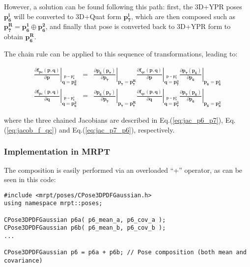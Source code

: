 \documentclass[a4paper,11pt]{report}
\begin{document}
However, a solution can be found following this path: first,
the 3D+YPR poses $\mathbf{p_6^i}$ will be converted to
3D+Quat form $\mathbf{p_7^i}$, which are then
composed such as $\mathbf{p_7^R} = \mathbf{p_6^1} \oplus \mathbf{p_6^2}$,
and finally that pose is converted back to 3D+YPR form to obtain
$\mathbf{p_6^R}$.

The chain rule can be applied to this sequence of transformations, leading to:

\begin{eqnarray}
 \left.
\frac{\partial \mathbf{f_{pc}}(\mathbf{p},\mathbf{q}) }{\partial \mathbf{p}} \right|
 _{\overset{ \mathbf{p}=\mathbf{p_6^1} }{ \mathbf{q}=\mathbf{p_6^2} }}
&=&
 \left.
\frac{\partial \mathbf{p_6} (\mathbf{p_7} ) }{\partial \mathbf{p_7}}
\right|
 _{ \mathbf{p_7}=\mathbf{p_7^R} }
 \left.
\frac{\partial \mathbf{f_{qc}} (\mathbf{p},\mathbf{q} ) }{\partial \mathbf{p}}
\right|
 _{\overset{ \mathbf{p}=\mathbf{p_7^1} }{ \mathbf{q}=\mathbf{p_7^2} }}
 \left.
\frac{\partial \mathbf{p_7} (\mathbf{p_6} ) }{\partial \mathbf{p_6}}
\right|
 _{ \mathbf{p_6}=\mathbf{p_6^1} }
\\
 \left.
\frac{\partial \mathbf{f_{pc}}(\mathbf{p},\mathbf{q}) }{\partial \mathbf{q}} \right|
 _{\overset{ \mathbf{p}=\mathbf{p_6^1} }{ \mathbf{q}=\mathbf{p_6^2} }}
&=&
 \left.
\frac{\partial \mathbf{p_6} (\mathbf{p_7} ) }{\partial \mathbf{p_7}}
\right|
 _{ \mathbf{p_7}=\mathbf{p_7^R} }
 \left.
\frac{\partial \mathbf{f_{qc}} (\mathbf{p},\mathbf{q} ) }{\partial \mathbf{q}}
\right|
 _{\overset{ \mathbf{p}=\mathbf{p_7^1} }{ \mathbf{q}=\mathbf{p_7^2} }}
 \left.
\frac{\partial \mathbf{p_7} (\mathbf{p_6} ) }{\partial \mathbf{p_6}}
\right|
 _{ \mathbf{p_6}=\mathbf{p_6^2} }
\end{eqnarray}

\noindent where the three chained Jacobians are described in
Eq.(\ref{eq:jac_p6_p7}), Eq.(\ref{eq:jacob_f_qc}) and Eq.(\ref{eq:jac_p7_p6}), respectively.



\subsubsection{Implementation in MRPT}

The composition is easily performed via an overloaded ``+'' operator, as can be seen in this code:

\begin{lstlisting}
#include <mrpt/poses/CPose3DPDFGaussian.h>
using namespace mrpt::poses;

CPose3DPDFGaussian p6a( p6_mean_a, p6_cov_a );
CPose3DPDFGaussian p6b( p6_mean_b, p6_cov_b );
...

CPose3DPDFGaussian p6 = p6a + p6b; // Pose composition (both mean and covariance)
\end{lstlisting}
\end{document}
